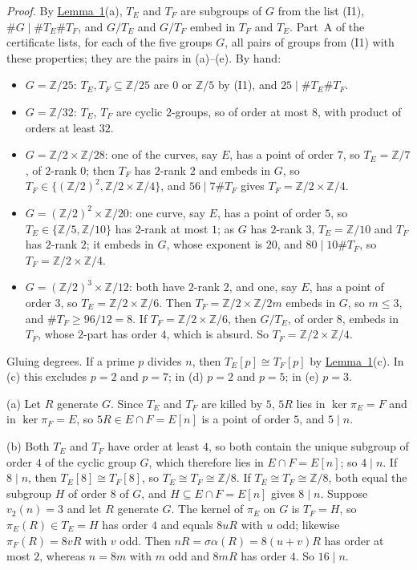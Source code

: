 \documentclass[11pt]{article}
\newcommand{\Z}{\mathbb Z}
\begin{document}
\emph{Proof.} By \hyperref[lemma-gluing]{Lemma~1}(a), \(T_E\) and \(T_F\) are subgroups of \(G\) from the list
(I1), \(\#G\mid\#T_E\#T_F\), and \(G/T_E\) and \(G/T_F\) embed in \(T_F\) and \(T_E\). Part~A of the certificate
lists, for each of the five groups \(G\), all pairs of groups from (I1) with these properties; they are the pairs
in (a)--(e). By hand:
\begin{itemize}
\item \(G=\Z/25\): \(T_E,T_F\subseteq\Z/25\) are \(0\) or \(\Z/5\) by (I1), and \(25\mid\#T_E\#T_F\).
\item \(G=\Z/32\): \(T_E\), \(T_F\) are cyclic \(2\)-groups, so of order at most \(8\), with product of orders at
least \(32\).
\item \(G=\Z/2\times\Z/28\): one of the curves, say \(E\), has a point of order \(7\), so \(T_E=\Z/7\), of
\(2\)-rank \(0\); then \(T_F\) has \(2\)-rank \(2\) and embeds in \(G\), so \(T_F\in\{(\Z/2)^2,\Z/2\times\Z/4\}\),
and \(56\mid7\#T_F\) gives \(T_F=\Z/2\times\Z/4\).
\item \(G=(\Z/2)^2\times\Z/20\): one curve, say \(E\), has a point of order \(5\), so \(T_E\in\{\Z/5,\Z/10\}\) has
\(2\)-rank at most \(1\); as \(G\) has \(2\)-rank \(3\), \(T_E=\Z/10\) and \(T_F\) has \(2\)-rank \(2\); it embeds in
\(G\), whose exponent is \(20\), and \(80\mid10\#T_F\), so \(T_F=\Z/2\times\Z/4\).
\item \(G=(\Z/2)^3\times\Z/12\): both have \(2\)-rank \(2\), and one, say \(E\), has a point of order \(3\), so
\(T_E=\Z/2\times\Z/6\). Then \(T_F=\Z/2\times\Z/2m\) embeds in \(G\), so \(m\le3\), and \(\#T_F\ge96/12=8\). If
\(T_F=\Z/2\times\Z/6\), then \(G/T_E\), of order \(8\), embeds in \(T_F\), whose \(2\)-part has order \(4\), which
is absurd. So \(T_F=\Z/2\times\Z/4\).
\end{itemize}
Gluing degrees. If a prime \(p\) divides \(n\), then \(T_E[p]\cong T_F[p]\) by
\hyperref[lemma-gluing]{Lemma~1}(c). In (c) this excludes \(p=2\) and \(p=7\); in (d) \(p=2\) and \(p=5\); in (e)
\(p=3\).

(a) Let \(R\) generate \(G\). Since \(T_E\) and \(T_F\) are killed by \(5\), \(5R\) lies in \(\ker\pi_E=F\) and in
\(\ker\pi_F=E\), so \(5R\in E\cap F=E[n]\) is a point of order \(5\), and \(5\mid n\).

(b) Both \(T_E\) and \(T_F\) have order at least \(4\), so both contain the unique subgroup of order \(4\) of the
cyclic group \(G\), which therefore lies in \(E\cap F=E[n]\); so \(4\mid n\). If \(8\mid n\), then
\(T_E[8]\cong T_F[8]\), so \(T_E\cong T_F\cong\Z/8\). If \(T_E\cong T_F\cong\Z/8\), both equal the subgroup \(H\) of
order \(8\) of \(G\), and \(H\subseteq E\cap F=E[n]\) gives \(8\mid n\). Suppose \(v_2(n)=3\) and let \(R\) generate
\(G\). The kernel of \(\pi_E\) on \(G\) is \(T_F=H\), so \(\pi_E(R)\in T_E=H\) has order \(4\) and equals \(8uR\)
with \(u\) odd; likewise \(\pi_F(R)=8vR\) with \(v\) odd. Then \(nR=\sigma\alpha(R)=8(u+v)R\) has order at most
\(2\), whereas \(n=8m\) with \(m\) odd and \(8mR\) has order \(4\). So \(16\mid n\).
\end{document}
